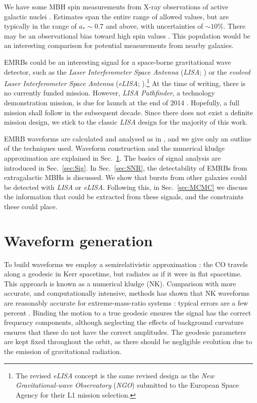 \documentclass[useAMS,usedcolumn,usegraphicx,usenatbib]{mn2e}
\newcommand{\secref}[1]{Sec.~\ref{sec:#1}}
\begin{document}
We have some MBH spin measurements from X-ray observations of active galactic nuclei \citep[e.g.][]{Walton2013}. Estimates span the entire range of allowed values, but are typically in the range of $a_\ast \sim 0.7$ and above, with uncertainties of $\sim 10\%$. There may be an observational bias toward high spin values \citep{Brenneman2011}. This population would be an interesting comparison for potential measurements from nearby galaxies. %

EMRBs could be an interesting signal for a space-borne gravitational wave detector, such as the \textit{Laser Interferometer Space Antenna} (\textit{LISA}; \citealt{Bender1998, Danzmann2003}) or the \textit{evolved Laser Interferometer Space Antenna} (\textit{eLISA}; \citealt{Jennrich2011, Amaro-Seoane2012a}).\footnote{The revised \textit{eLISA} concept is the same revised design as the \textit{New Gravitational-wave Observatory} (\textit{NGO}) submitted to the European Space Agency for their L1 mission selection.} At the time of writing, there is no currently funded mission. However, \textit{LISA Pathfinder}, a technology demonstration mission, is due for launch at the end of 2014 \citep{Anza2005, Antonucci2012}. Hopefully, a full mission shall follow in the subsequent decade. Since there does not exist a definite mission design, we stick to the classic \textit{LISA} design for the majority of this work.

EMRB waveforms are calculated and analysed as in \citet{Berry2013}, and we give only an outline of the techniques used. Waveform construction and the numerical kludge approximation are explained in \secref{Wave}. The basics of signal analysis are introduced in \secref{Sig}. In \secref{SNR}, the detectability of EMRBs from extragalactic MBHs is discussed. We show that bursts from other galaxies could be detected with \textit{LISA} or \textit{eLISA}. Following this, in \secref{MCMC} we discuss the information that could be extracted from these signals, and the constraints these could place.

\section{Waveform generation}\label{sec:Wave}

To build waveforms we employ a semirelativistic approximation \citep{Ruffini1981}: the CO travels along a geodesic in Kerr spacetime, but radiates as if it were in flat spacetime. This approach is known as a numerical kludge (NK). Comparison with more accurate, and computationally intensive, methods has shown that NK waveforms are reasonably accurate for extreme-mass-ratio systems \citep{Gair2005, Babak2007}: typical errors are a few percent \citep{Tanaka1993,Gair2005,Berry2013}. Binding the motion to a true geodesic ensures the signal has the correct frequency components, although neglecting the effects of background curvature ensures that these do not have the correct amplitudes. The geodesic parameters are kept fixed throughout the orbit, as there should be negligible evolution due to the emission of gravitational radiation.
\end{document}
